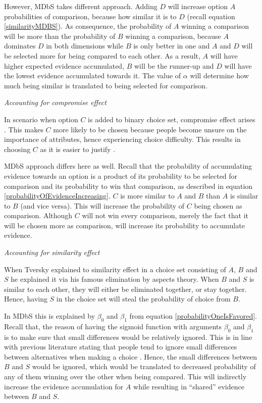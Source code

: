 \documentclass[a4paper,12pt]{article}
\newcommand{\citeyearonly}[1]{\citeyearpar{#1}}
\begin{document}
However, MDbS takes different approach. Adding $D$ will increase option $A$ probabilities of comparison, because how similar it is to $D$ (recall equation \ref{similarityMDBS}). As consequence, the probability of $A$ winning a comparison will be more than the probability of $B$ winning a comparison, because $A$ dominates $D$ in both dimensions while $B$ is only better in one and $A$ and $D$ will be selected more for being  compared to each other. As a result, $A$ will have higher expected evidence accumulated, $B$ will be the runner-up and $D$ will have the lowest evidence accumulated towards it. The value of $\alpha$ will determine how much being similar is translated to being selected for comparison.

\textit{Accounting for compromise effect}

In scenario when option $C$ is added to binary choice set, compromise effect arises \citep{simonson89}. This makes $C$ more likely to be chosen because people become unsure on the importance of attributes, hence experiencing choice difficulty. This results in choosing $C$ as it is easier to justify \citep{simonson89}. 

MDbS approach differs here as well. Recall that the probability of accumulating evidence towards an option is a product of its probability to be selected for comparison and its probability to win that comparison, as described in equation \ref{probabilityOfEvidenceIncreasing}. $C$ is more similar to $A$ and $B$ than $A$ is similar to $B$ (and vice versa). This will increase the probability of $C$ being chosen as comparison. Although $C$ will not win every comparison, merely the fact that it will be chosen more as comparison, will increase its probability to accumulate evidence.

\textit{Accounting for similarity effect}

When Tversky \citeyearonly{tversky1972elimination} explained to similarity effect in a choice set consisting of $A$, $B$ and $S$ he explained it via his famous elimination by aspects theory. When $B$ and $S$ is similar to each other, they will either be eliminated together, or stay together. Hence, having $S$ in the choice set will steal the probability of choice from $B$.

In MDbS this is explained by $\beta_0$ and $\beta_1$ from equation \ref{probabilityOneIsFavored}. Recall that, the reason of having the sigmoid function with arguments $\beta_0$ and $\beta_1$ is to make sure that small differences would be relatively ignored. This is in line with previous literature stating that people tend to ignore small differences between alternatives when making a choice \citep{kalwani1992consumer}. Hence, the small differences between $B$ and $S$ would be ignored, which would be translated to decreased probability of any of them winning over the other when being compared. This will indirectly increase the evidence accumulation for $A$ while resulting in ``shared'' evidence between $B$ and $S$.
\end{document}
